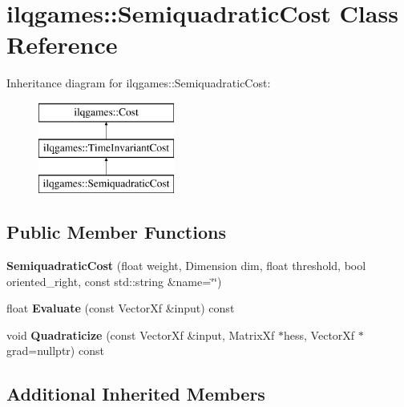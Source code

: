 \hypertarget{classilqgames_1_1_semiquadratic_cost}{}\section{ilqgames\+:\+:Semiquadratic\+Cost Class Reference}
\label{classilqgames_1_1_semiquadratic_cost}
Inheritance diagram for ilqgames\+:\+:Semiquadratic\+Cost\+:\begin{figure}[H]
\begin{center}
\leavevmode
\includegraphics[height=3.000000cm]{classilqgames_1_1_semiquadratic_cost}
\end{center}
\end{figure}
\subsection*{Public Member Functions}
\begin{DoxyCompactItemize}
\item 
{\bfseries Semiquadratic\+Cost} (float weight, Dimension dim, float threshold, bool oriented\+\_\+right, const std\+::string \&name=\char`\"{}\char`\"{})\hypertarget{classilqgames_1_1_semiquadratic_cost_a007448675efe7997d373403c08eaaff1}{}\label{classilqgames_1_1_semiquadratic_cost_a007448675efe7997d373403c08eaaff1}

\item 
float {\bfseries Evaluate} (const Vector\+Xf \&input) const \hypertarget{classilqgames_1_1_semiquadratic_cost_a1c4e3c92a5f72383d72c4d8e3191c26c}{}\label{classilqgames_1_1_semiquadratic_cost_a1c4e3c92a5f72383d72c4d8e3191c26c}

\item 
void {\bfseries Quadraticize} (const Vector\+Xf \&input, Matrix\+Xf $\ast$hess, Vector\+Xf $\ast$grad=nullptr) const \hypertarget{classilqgames_1_1_semiquadratic_cost_afa2939babaa05a78180142db69f4e268}{}\label{classilqgames_1_1_semiquadratic_cost_afa2939babaa05a78180142db69f4e268}

\end{DoxyCompactItemize}
\subsection*{Additional Inherited Members}


